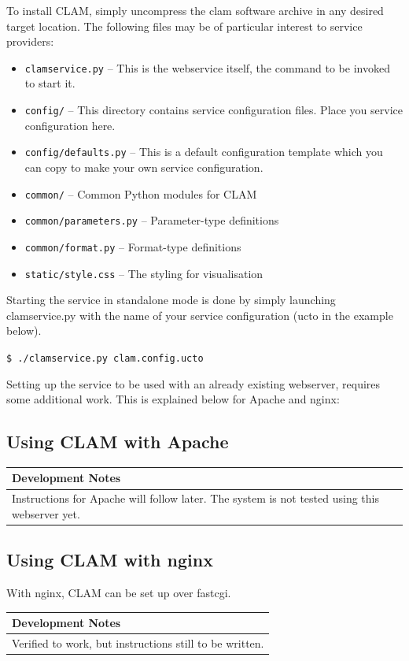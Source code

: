 \documentclass[a4paper,12pt]{report}
\newenvironment{devnotes}
{\newpage
\begin{center}
    \begin{tabular}[h!]{|p{0.8\textwidth}|}
    \hline
    {\bf Development Notes}\\\hline}
{   \\\hline
    \end{tabular}
\end{center}}
\begin{document}
To install CLAM, simply uncompress the clam software archive in any desired target location. The following files may be of particular interest to service providers:

\begin{itemize}
\item \texttt{clamservice.py} -- This is the webservice itself, the command to be invoked to start it.
\item \texttt{config/} -- This directory contains service configuration files. Place you service configuration here.
\item \texttt{config/defaults.py} -- This is a default configuration template which you can copy to make your own service configuration.
\item \texttt{common/} -- Common Python modules for CLAM
\item \texttt{common/parameters.py} -- Parameter-type definitions
\item \texttt{common/format.py} -- Format-type definitions
\item \texttt{static/style.css} -- The styling for visualisation

\end{itemize}

Starting the service in standalone mode is done by simply launching clamservice.py with the name of your service configuration (ucto in the example below).

\texttt{\$ ./clamservice.py clam.config.ucto}


Setting up the service to be used with an already existing webserver, requires some additional work. This is explained below for Apache and nginx:

\subsection{Using CLAM with Apache}

\begin{devnotes}
Instructions for Apache will follow later. The system is not tested using this webserver yet.
\end{devnotes}

\subsection{Using CLAM with nginx}

With nginx, CLAM can be set up over fastcgi. 

\begin{devnotes}
Verified to work, but instructions still to be written.
\end{devnotes}
\end{document}
